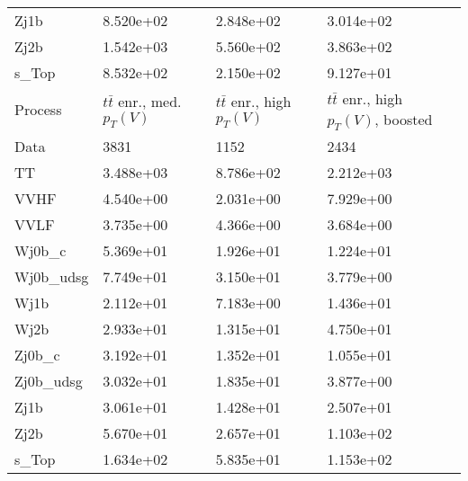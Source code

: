\begin{table}
{\begin{tabularx}{0.8\textwidth}{|X|X|X|X|}
Zj1b & 8.520e+02 & 2.848e+02 & 3.014e+02 \\
Zj2b & 1.542e+03 & 5.560e+02 & 3.863e+02 \\
s\_Top & 8.532e+02 & 2.150e+02 & 9.127e+01 \\
\hline
\hline
Process & $t\bar{t}$ enr., med. $p_{T}(V)$ & $t\bar{t}$ enr., high $p_{T}(V)$ & $t\bar{t}$ enr., high $p_{T}(V)$, boosted \\
\hline
Data & 3831 & 1152 & 2434 \\
\hline
TT & 3.488e+03 & 8.786e+02 & 2.212e+03 \\
VVHF & 4.540e+00 & 2.031e+00 & 7.929e+00 \\
VVLF & 3.735e+00 & 4.366e+00 & 3.684e+00 \\
Wj0b\_c & 5.369e+01 & 1.926e+01 & 1.224e+01 \\
Wj0b\_udsg & 7.749e+01 & 3.150e+01 & 3.779e+00 \\
Wj1b & 2.112e+01 & 7.183e+00 & 1.436e+01 \\
Wj2b & 2.933e+01 & 1.315e+01 & 4.750e+01 \\
Zj0b\_c & 3.192e+01 & 1.352e+01 & 1.055e+01 \\
Zj0b\_udsg & 3.032e+01 & 1.835e+01 & 3.877e+00 \\
Zj1b & 3.061e+01 & 1.428e+01 & 2.507e+01 \\
Zj2b & 5.670e+01 & 2.657e+01 & 1.103e+02 \\
s\_Top & 1.634e+02 & 5.835e+01 & 1.153e+02 \\
\hline
\end{tabularx}
}
\label{tab:cr-Znn-2018}
\end{table}

